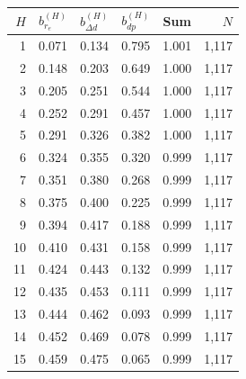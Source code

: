 \begin{tabular}{rccccr}
\toprule
$H$ & $b^{(H)}_{r_e}$ & $b^{(H)}_{\Delta d}$ & $b^{(H)}_{dp}$ & Sum & $N$ \\
\midrule
1 & 0.071 & 0.134 & 0.795 & 1.001 & 1,117 \\
2 & 0.148 & 0.203 & 0.649 & 1.000 & 1,117 \\
3 & 0.205 & 0.251 & 0.544 & 1.000 & 1,117 \\
4 & 0.252 & 0.291 & 0.457 & 1.000 & 1,117 \\
5 & 0.291 & 0.326 & 0.382 & 1.000 & 1,117 \\
6 & 0.324 & 0.355 & 0.320 & 0.999 & 1,117 \\
7 & 0.351 & 0.380 & 0.268 & 0.999 & 1,117 \\
8 & 0.375 & 0.400 & 0.225 & 0.999 & 1,117 \\
9 & 0.394 & 0.417 & 0.188 & 0.999 & 1,117 \\
10 & 0.410 & 0.431 & 0.158 & 0.999 & 1,117 \\
11 & 0.424 & 0.443 & 0.132 & 0.999 & 1,117 \\
12 & 0.435 & 0.453 & 0.111 & 0.999 & 1,117 \\
13 & 0.444 & 0.462 & 0.093 & 0.999 & 1,117 \\
14 & 0.452 & 0.469 & 0.078 & 0.999 & 1,117 \\
15 & 0.459 & 0.475 & 0.065 & 0.999 & 1,117 \\
\bottomrule
\end{tabular}
